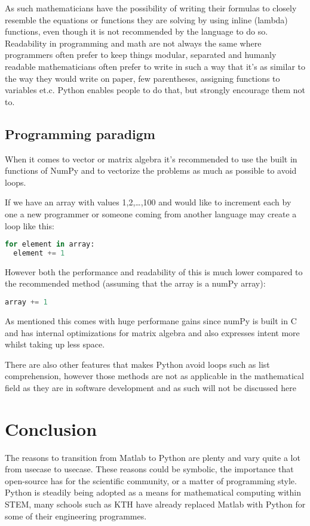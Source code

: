 \documentclass{article}
\begin{document}
As such mathematicians have the possibility of writing their formulas to closely resemble the equations or functions they are solving
by using inline (lambda) functions, even though it is not recommended by the language to do so. Readability in programming and math are
not always the same where programmers often prefer to keep things modular, separated and humanly readable mathematicians often prefer
to write in such a way that it's as similar to the way they would write on paper, few parentheses, assigning functions to variables et.c.
Python enables people to do that, but strongly encourage them not to.

\subsection{Programming paradigm}
When it comes to vector or matrix algebra it's recommended to use the built in functions of NumPy and to vectorize the problems
as much as possible to avoid loops.

If we have an array with values 1,2,\ldots,100 and would like to increment each by one a new programmer or someone coming from another
language may create a loop like this:
\begin{lstlisting}[language=Python]
for element in array:
  element += 1
\end{lstlisting}
However both the performance and readability of this is much lower compared to the recommended method (assuming that the array is a
numPy array):
\begin{lstlisting}[language=Python]
array += 1
\end{lstlisting}

As mentioned this comes with huge performane gains since numPy is built in C and has internal optimizations for matrix algebra and also
expresses intent more whilst taking up less space.

There are also other features that makes Python avoid loops such as list comprehension, however those methods are not as applicable
in the mathematical field as they are in software development and as such will not be discussed here




\section{Conclusion}%
The reasons to transition from Matlab to Python are plenty and vary quite a lot from usecase to usecase. 
These reasons could be symbolic, the importance that open-source has for the scientific community,
or a matter of programming style. Python is steadily being adopted as a means for mathematical computing within STEM, 
many schools such as KTH have already replaced Matlab with Python for some of their engineering programmes.
\newline
\end{document}
